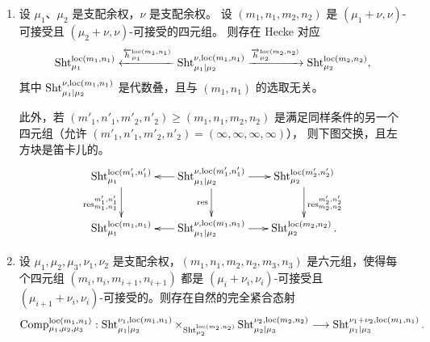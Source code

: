 \begin{proposition}
\label{P:pushforward is local}
\begin{enumerate}
\item 设 $\mu_1$、$\mu_2$ 是支配余权，$\nu$ 是支配余权。
设 $(m_1,n_1,m_2,n_2)$ 是 $(\mu_1+\nu, \nu)$-可接受且 $(\mu_2+\nu,\nu)$-可接受的四元组。
则存在 Hecke 对应
\begin{equation}\label{deompf1}
\operatorname{Sht}_{\mu_1}^{\mathrm{loc}(m_1,n_1)}\xleftarrow{\overleftarrow{h}_{\mu_1}^{\mathrm{loc}(m_1,n_1)}} \operatorname{Sht}_{\mu_1\mid \mu_2}^{\nu,\mathrm{loc}(m_1,n_1)}\xrightarrow{\overrightarrow{h}_{\mu_2}^{\mathrm{loc}(m_2,n_2)}} \operatorname{Sht}_{\mu_2}^{\mathrm{loc}(m_{2},n_{2})},
\end{equation}
其中 $\operatorname{Sht}_{\mu_1|\mu_2}^{\nu,\mathrm{loc}(m_1,n_1)}$ 是代数叠，且与 $(m_1,n_1)$ 的选取无关。

此外，若 $(m'_1,n'_1,m'_2,n'_2)\geq (m_1,n_1,m_2,n_2)$ 是满足同样条件的另一个四元组（允许 $(m'_1,n'_1,m'_2,n'_2)=(\infty,\infty,\infty,\infty)$），
则下图交换，且左方块是笛卡儿的。
\begin{equation*}
\label{E:cycle construction diagram full}
\xymatrix@C=17pt{
\Sht_{\mu_1}^{\loc(m'_1,n'_1)}\ar_{\res^{m'_1,n'_1}_{m_1,n_1}}[d]
&\Sht_{\mu_1|\mu_2}^{\nu,\loc(m'_1,n'_1)}\ar_{\res}[d]\ar[l]\ar[r]& \Sht_{\mu_2}^{\loc(m'_2,n'_2)}\ar^{\res^{m'_2,n'_2}_{m_2,n_2}}[d]
\\
\Sht_{\mu_1}^{\loc(m_1,n_1)}&\Sht_{\mu_1|\mu_2}^{\nu,\loc(m_1,n_1)}\ar[l]\ar[r]& \Sht_{\mu_2}^{\loc(m_2,n_2)}.
}
\end{equation*}

\item 设 $\mu_1,\mu_2,\mu_3,\nu_1,\nu_2$ 是支配余权，$(m_1,n_1,m_2,n_2,m_3,n_3)$ 是六元组，使得每个四元组 $(m_i,n_i,m_{i+1},n_{i+1})$ 都是 $(\mu_i+\nu_i,\nu_i)$-可接受且 $(\mu_{i+1}+\nu_i,\nu_i)$-可接受的。则存在自然的完全紧合态射
\begin{equation*}
\label{E:composition restricted}
\operatorname{Comp}_{\mu_1, \mu_2, \mu_3}^{\mathrm{loc}(m_1,n_1)}: \operatorname{Sht}_{\mu_1|\mu_2}^{\nu_1,\mathrm{loc}(m_1,n_1)} \times_{\operatorname{Sht}_{\mu_2}^{\mathrm{loc}(m_2,n_2)}} \operatorname{Sht}_{\mu_2|\mu_3}^{\nu_2,\mathrm{loc}(m_2,n_2)} \longrightarrow \operatorname{Sht}_{\mu_1|\mu_3}^{\nu_1+\nu_2,\mathrm{loc} (m_1,n_1)}.
\end{equation*}


\end{enumerate}
\end{proposition}
